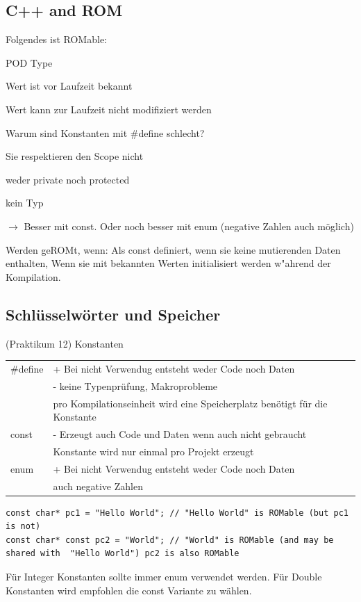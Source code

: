 \subsection{C++ and ROM}
Folgendes ist ROMable:
\begin{compactitem}


\item POD Type
\item Wert ist vor Laufzeit bekannt
\item Wert kann zur Laufzeit nicht modifiziert werden
\item Warum sind Konstanten mit \#define schlecht?
	\begin{compactitem}
		\item Sie respektieren den Scope nicht
		\item weder private noch protected
		\item kein Typ
	\end{compactitem}
	$\rightarrow$ Besser mit const. Oder noch besser mit enum (negative Zahlen auch möglich)
\item Werden geROMt, wenn: Als const definiert, wenn sie keine mutierenden
	Daten enthalten, Wenn sie mit bekannten Werten initialisiert werden
	w"ahrend der Kompilation.
\end{compactitem}

\subsection{Schlüsselwörter und Speicher}  (Praktikum 12)
Konstanten\\
\begin{tabular}{l|l}
\hline
   \#define  & + Bei nicht Verwendug entsteht weder Code noch Daten\\
             & - keine Typenprüfung, Makroprobleme\\
             & pro Kompilationseinheit wird eine Speicherplatz benötigt für die Konstante \\ \hline
    const    & - Erzeugt auch Code und Daten wenn auch nicht gebraucht\\
             & Konstante wird nur einmal pro Projekt erzeugt\\\hline
    enum     & + Bei nicht Verwendug entsteht weder Code noch Daten\\
             & auch negative Zahlen\\\hline
\end{tabular}

\begin{lstlisting}
const char* pc1 = "Hello World"; // "Hello World" is ROMable (but pc1 is not)
const char* const pc2 = "World"; // "World" is ROMable (and may be shared with  "Hello World") pc2 is also ROMable
\end{lstlisting}
Für Integer Konstanten sollte immer enum verwendet werden. Für Double Konstanten wird empfohlen die const Variante zu wählen.\\

